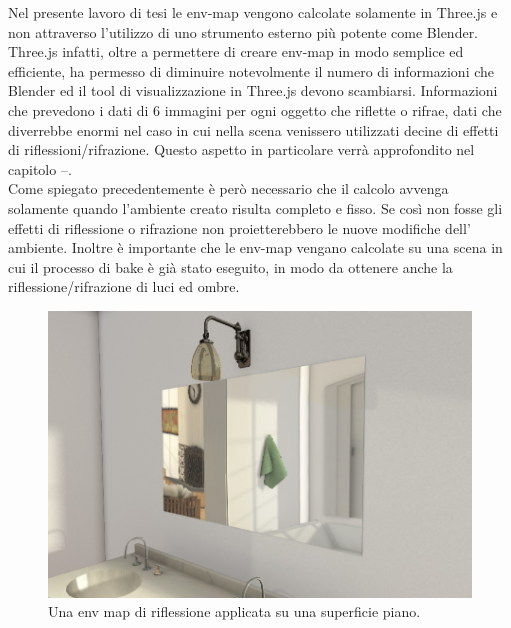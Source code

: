Nel presente lavoro di tesi le env-map vengono calcolate solamente in Three.js e non attraverso l’utilizzo di uno strumento esterno più potente come Blender.
Three.js infatti, oltre a permettere di creare env-map in modo semplice ed efficiente, ha permesso di diminuire notevolmente il numero di informazioni che Blender ed il tool di visualizzazione in Three.js devono scambiarsi. Informazioni che prevedono i dati di 6 immagini per ogni oggetto che riflette o rifrae, dati che diverrebbe enormi nel caso in cui nella scena venissero utilizzati decine di effetti di riflessioni/rifrazione. Questo aspetto in particolare verrà approfondito nel capitolo --.
\\
Come spiegato precedentemente è però necessario che il calcolo avvenga solamente quando l’ambiente creato risulta completo e fisso. Se così non fosse gli effetti di riflessione o rifrazione non proietterebbero le nuove modifiche dell’ ambiente.
Inoltre è importante che le env-map vengano calcolate su una scena in cui il processo di bake è già stato eseguito, in modo da ottenere anche la riflessione/rifrazione di luci ed ombre.
\\
\begin{figure}[htb]
 \centering
 \includegraphics[width=1\linewidth]{images/chapter_lrl/lrl_envspecchio.png}\hfill
 \caption[Env map di riflessione]{Una env map di riflessione applicata su una superficie piano.}
 \label{fig:lrl_envspecchio}
\end{figure}

